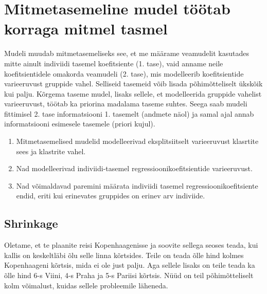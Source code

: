\documentclass[]{book}
\begin{document}
\hypertarget{mitmetasemeline-mudel-tootab-korraga-mitmel-tasmel}{%
\section{Mitmetasemeline mudel töötab korraga mitmel tasmel}\label{mitmetasemeline-mudel-tootab-korraga-mitmel-tasmel}}

Mudeli muudab mitmetasemeliseks see, et me määrame veamudelit kasutades mitte ainult indiviidi tasemel koefitsiente (1. tase), vaid anname neile koefitsientidele omakorda veamudeli (2. tase), mis modelleerib koefitsientide varieeruvust gruppide vahel. Selliseid tasemeid võib lisada põhimõtteliselt ükskõik kui palju. Kõrgema taseme mudel, lisaks sellele, et modelleerida gruppide vahelist varieeruvust, töötab ka priorina madalama taseme suhtes. Seega saab mudeli fittimisel 2. tase informatsiooni 1. tasemelt (andmete näol) ja samal ajal annab informatsiooni esimesele tasemele (priori kujul).

\begin{enumerate}
\def\labelenumi{\arabic{enumi}.}
\item
  Mitmetasemelised mudelid modelleerivad eksplitsiitselt varieeruvust klasrtite sees ja klastrite vahel.
\item
  Nad modelleerivad indiviidi-tasemel regressioonikoefitsientide varieeruvust.
\item
  Nad võimaldavad paremini määrata indiviidi tasemel regressioonikoefitsiente endid, eriti kui erinevates gruppides on erinev arv indiviide.
\end{enumerate}

\hypertarget{shrinkage}{%
\subsection*{Shrinkage}\label{shrinkage}}

Oletame, et te plaanite reisi Kopenhaagenisse ja soovite sellega seoses teada, kui kallis on keskeltläbi õlu selle linna kõrtsides. Teile on teada õlle hind kolmes Kopenhaageni kõrtsis, mida ei ole just palju. Aga sellele lisaks on teile teada ka õlle hind 6-s Viini, 4-s Praha ja 5-s Pariisi kõrtsis. Nüüd on teil põhimõtteliselt kolm võimalust, kuidas sellele probleemile läheneda.
\end{document}
